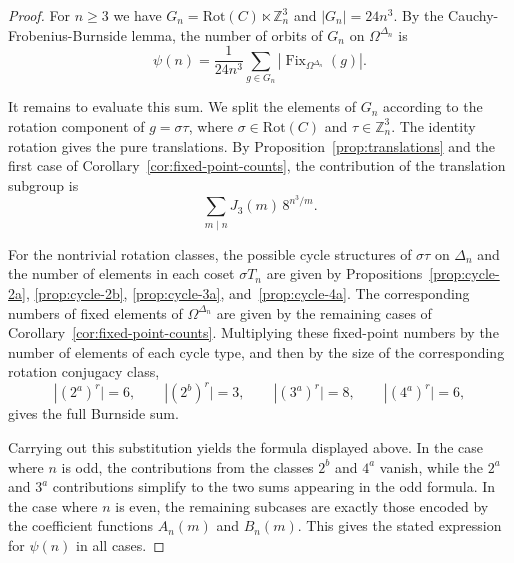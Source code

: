 \documentclass[12pt]{article}
\theoremstyle{definition}
\theoremstyle{remark}
\begin{document}
\begin{proof}
For $n\geq 3$ we have
$G_n=\mathrm{Rot}(C)\ltimes \mathbb Z_n^3$ and
$\vert G_n\vert =24n^3.$
By the Cauchy-Frobenius-Burnside lemma, the number of orbits of $G_n$ on
$\Omega^{\Delta_n}$ is
\[
\psi(n)
=
\frac{1}{24n^3}
\sum_{g\in G_n}
\left|\operatorname{Fix}_{\Omega^{\Delta_n}}(g)\right|.
\]

It remains to evaluate this sum. We split the elements of $G_n$ according
to the rotation component of $g=\sigma\tau$, where
$\sigma\in \mathrm{Rot}(C)$ and $\tau\in \mathbb Z_n^3$. The identity
rotation gives the pure translations. By Proposition~\ref{prop:translations}
and the first case of Corollary~\ref{cor:fixed-point-counts}, the contribution of the
translation subgroup is
\[
\sum_{m\mid n}J_3(m)\,8^{n^3/m}.
\]

For the nontrivial rotation classes, the possible cycle structures of
$\sigma\tau$ on $\Delta_n$ and the number of elements in each coset
$\sigma T_n$ are given by
Propositions~\ref{prop:cycle-2a}, \ref{prop:cycle-2b},
\ref{prop:cycle-3a}, and~\ref{prop:cycle-4a}. The corresponding numbers of
fixed elements of $\Omega^{\Delta_n}$ are given by
the remaining cases of Corollary~\ref{cor:fixed-point-counts}. Multiplying these fixed-point
numbers by the number of elements of each cycle type, and then by the size
of the corresponding rotation conjugacy class,
\[
|{(2^a)}^r\vert =6,\qquad |{(2^b)}^r\vert =3,\qquad
|{(3^a)}^r\vert =8,\qquad |{(4^a)}^r\vert =6,
\]
gives the full Burnside sum.

Carrying out this substitution yields the formula displayed above. In the
case where $n$ is odd, the contributions from the classes $2^b$ and $4^a$
vanish, while the $2^a$ and $3^a$ contributions simplify to the two sums
appearing in the odd formula. In the case where $n$ is even, the remaining
subcases are exactly those encoded by the coefficient functions $A_n(m)$
and $B_n(m)$. This gives the stated expression for $\psi(n)$ in all cases.
\end{proof}
\end{document}

